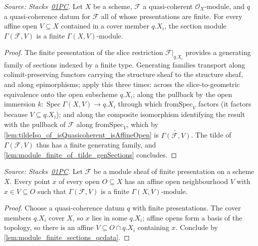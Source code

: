 \begin{lemma}
  \leanok
  \label{lem:module_finite_sections_qcdata}
  \textit{Source: Stacks~\href{https://stacks.math.columbia.edu/tag/01PC}{01PC}.}
  Let \(X\) be a scheme, \(\mathcal F\) a quasi-coherent
  \(\mathcal O_X\)-module, and \(q\) a quasi-coherence datum for
  \(\mathcal F\) all of whose presentations are finite. For every affine open
  \(V \subseteq X\) contained in a cover member \(q.X_i\), the section module
  \(\Gamma(\mathcal F, V)\) is a finite \(\Gamma(X, V)\)-module.
\end{lemma}
\begin{proof}
  \leanok
  The finite presentation of the slice restriction
  \(\mathcal F|_{q.X_i}\) provides a generating family of sections indexed by
  a finite type. Generating families transport along colimit-preserving
  functors carrying the structure sheaf to the structure sheaf, and along
  epimorphisms; apply this three times: across the slice-to-geometric
  equivalence onto the open subscheme \(q.X_i\); along the pullback by the
  open immersion \(k : \operatorname{Spec} \Gamma(X, V) \to q.X_i\) through
  which \(\mathrm{fromSpec}_V\) factors (it factors because
  \(V \subseteq q.X_i\)); and along the composite isomorphism identifying the
  result with the pullback of \(\mathcal F\) along \(\mathrm{fromSpec}_V\),
  which by \cref{lem:tildeIso_of_isQuasicoherent_isAffineOpen} is
  \(\widetilde{\Gamma(\mathcal F, V)}\). The tilde of
  \(\Gamma(\mathcal F, V)\) thus has a finite generating family, and
  \cref{lem:module_finite_of_tilde_genSections} concludes.
\end{proof}

\begin{lemma}
  \leanok
  \label{lem:affine_finite_sections_nhds}
  \textit{Source: Stacks~\href{https://stacks.math.columbia.edu/tag/01PC}{01PC}.}
  Let \(\mathcal F\) be a module sheaf of finite presentation on a scheme
  \(X\). Every point \(x\) of every open \(O \subseteq X\) has an affine open
  neighbourhood \(V\) with \(x \in V \subseteq O\) such that
  \(\Gamma(\mathcal F, V)\) is a finite \(\Gamma(X, V)\)-module.
\end{lemma}
\begin{proof}
  \leanok
  Choose a quasi-coherence datum \(q\) with finite presentations. The cover
  members \(q.X_i\) cover \(X\), so \(x\) lies in some \(q.X_i\); affine opens
  form a basis of the topology, so there is an affine
  \(V \subseteq O \cap q.X_i\) containing \(x\). Conclude by
  \cref{lem:module_finite_sections_qcdata}.
\end{proof}

